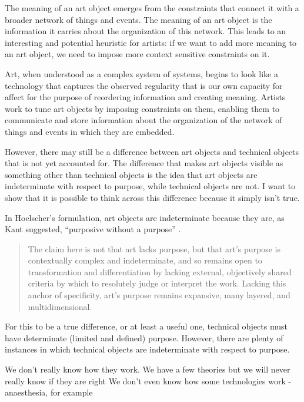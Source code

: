\documentclass[letterpaper]{article}
\begin{document}
    The meaning of an art object emerges from the constraints that connect it with a broader network of things and events. The meaning of an art object is the information it carries about the organization of this network. This leads to an interesting and potential heuristic for artists: if we want to add more meaning to an art object, we need to impose more context sensitive constraints on it.

    Art, when understood as a complex system of systems, begins to look like a technology that captures the observed regularity that is our own capacity for affect for the purpose of reordering information and creating meaning. Artists work to tune art objects by imposing constraints on them, enabling them to communicate and store information about the organization of the network of things and events in which they are embedded.

    However, there may still be a difference between art objects and technical objects that is not yet accounted for. The difference that makes art objects visible as something other than technical objects is the idea that art objects are indeterminate with respect to purpose, while technical objects are not. I want to show that it is possible to think across this difference because it simply isn't true.

    In Hoelscher's formulation, art objects are indeterminate because they are, as Kant suggested, “purposive without a purpose” \citep[p.57]{KantCrtqOfJdgmnt}.

    \begin{quote}
        The claim here is not that art lacks purpose, but that art's purpose is contextually complex and indeterminate, and so remains open to transformation and differentiation by lacking external, objectively shared criteria by which to resolutely judge or interpret the work. Lacking this anchor of specificity, art's purpose remains expansive, many layered, and multidimensional.\citep[p.25]{HoelscherThPtcsOfPhsSpc2014}
    \end{quote}

    For this to be a true difference, or at least a useful one, technical objects must have determinate (limited and defined) purpose. However, there are plenty of instances in which technical objects are indeterminate with respect to purpose.

    We don't really know how they work. We have a few theories but we will never really know if they are right
    We don't even know how some technologies work - anaesthesia, for example
    
\end{document}
